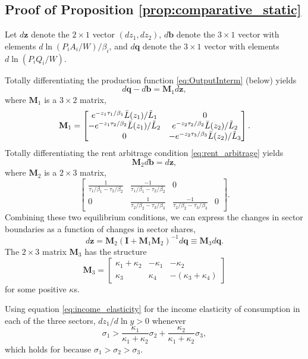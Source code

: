 \documentclass[12pt]{article}
\begin{document}
\subsection{Proof of Proposition \ref{prop:comparative_static}}
Let $d\mathbf z$ denote the $2\times1$ vector $(dz_1,dz_2)$, $d\mathbf b$ denote the $3\times1$ vector with elements $d\ln(P_iA_i/W)/\beta_i$, and $d\mathbf q$ denote the $3\times1$ vector with elements $d\ln(P_iQ_i/W)$.

Totally differentiating the production function \eqref{eq:OutputInterm} (below) yields
\[
d\mathbf q - d\mathbf b = \mathbf M_1 d\mathbf z,
\]
where $\mathbf M_1$ is a $3\times2$ matrix,
\[
\mathbf M_1 =
\begin{bmatrix}
	e^{-z_1\tau_1/\beta_1}\Bar L(z_1)/\tilde L_1 & 0\\
	-e^{-z_1\tau_2/\beta_2}\Bar L(z_1)/\tilde L_2 & 
		e^{-z_2\tau_2/\beta_2}\Bar L(z_2)/\tilde L_2\\
	0 & -e^{-z_2\tau_3/\beta_3}\Bar L(z_2)/\tilde L_3 
\end{bmatrix}.
\]
Totally differentiating the rent arbitrage condition \eqref{eq:rent_arbitrage} yields
\[
\mathbf M_2 d\mathbf b = d\mathbf z, 
\]
where $\mathbf M_2$ is a $2\times3$ matrix,
\[
\begin{bmatrix}
	\frac 1
		{\tau_1/\beta_1 - \tau_2/\beta_2}
	& 	\frac {-1}
		{\tau_1/\beta_1 - \tau_2/\beta_2}
	& 0 \\
	0
	& \frac 1
		{\tau_2/\beta_2 - \tau_3/\beta_3}
	& 	\frac {-1}
		{\tau_2/\beta_2 - \tau_3/\beta_3}
	& 0 
\end{bmatrix}.
\]
Combining these two equilibrium conditions, we can express the changes in sector boundaries as a function of changes in sector shares,
\[
d\mathbf z = \mathbf M_2 (\mathbf I+\mathbf M_1\mathbf M_2)^{-1}d\mathbf q \equiv \mathbf M_3 d\mathbf q.
\]
The $2\times3$ matrix $\mathbf M_3$ has the structure
\[
\mathbf M_3 =
\begin{bmatrix}
\kappa_1+\kappa_2 	& -\kappa_1 	& -\kappa_2 \\
\kappa_3 			& \kappa_4		& -(\kappa_3+\kappa_4)
\end{bmatrix}
\]
for some positive $\kappa$s. 

Using equation \eqref{eq:income_elasticity} for the income elasticity of consumption in each of the three sectors, $dz_1/d\ln y>0$ whenever 
\[
\sigma_1> \frac{\kappa_1}{\kappa_1+\kappa_2}\sigma_2 + \frac{\kappa_2}{\kappa_1+\kappa_2}\sigma_3, 
\]
which holds for because $\sigma_1>\sigma_2>\sigma_3$.
\end{document}
